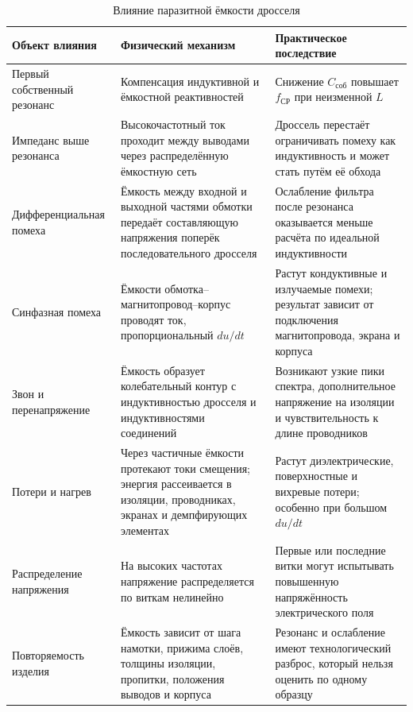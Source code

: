 \documentclass[14pt,a4paper]{extarticle}
\begin{document}
\begin{table}[htbp]
\begin{singlespace}
\caption{Влияние паразитной ёмкости дросселя}
\label{tab:capacitance-effects}
\centering
\small
\begin{tabularx}{\textwidth}{>{\raggedright\arraybackslash}p{34mm}
>{\raggedright\arraybackslash}p{50mm}
>{\raggedright\arraybackslash}X}
\toprule
Объект влияния & Физический механизм & Практическое последствие \\
\midrule
Первый собственный резонанс &
Компенсация индуктивной и ёмкостной реактивностей &
Снижение $C_{\text{соб}}$ повышает $f_{\text{СР}}$ при неизменной $L$ \\
Импеданс выше резонанса &
Высокочастотный ток проходит между выводами через распределённую ёмкостную
сеть &
Дроссель перестаёт ограничивать помеху как индуктивность и может стать путём
её обхода \\
Дифферен\-циальная помеха &
Ёмкость между входной и выходной частями обмотки передаёт составляющую
напряжения поперёк последовательного дросселя &
Ослабление фильтра после резонанса оказывается меньше расчёта по идеальной
индуктивности \\
Синфазная помеха &
Ёмкости обмотка--магнитопровод--корпус проводят ток, пропорциональный
$du/dt$ &
Растут кондуктивные и излучаемые помехи; результат зависит от подключения
магнитопровода, экрана и корпуса \\
Звон и перенапряжение &
Ёмкость образует колебательный контур с индуктивностью дросселя и
индуктивностями соединений &
Возникают узкие пики спектра, дополнительное напряжение на изоляции и
чувствительность к длине проводников \\
Потери и нагрев &
Через частичные ёмкости протекают токи смещения; энергия рассеивается в
изоляции, проводниках, экранах и демпфирующих элементах &
Растут диэлектрические, поверхностные и вихревые потери; особенно при большом
$du/dt$ \\
Распределение напряжения &
На высоких частотах напряжение распределяется по виткам нелинейно &
Первые или последние витки могут испытывать повышенную напряжённость
электрического поля \\
Повторяемость изделия &
Ёмкость зависит от шага намотки, прижима слоёв, толщины изоляции, пропитки,
положения выводов и корпуса &
Резонанс и ослабление имеют технологический разброс, который нельзя оценить
по одному образцу \\
\bottomrule
\end{tabularx}
\end{singlespace}
\end{table}
\end{document}
